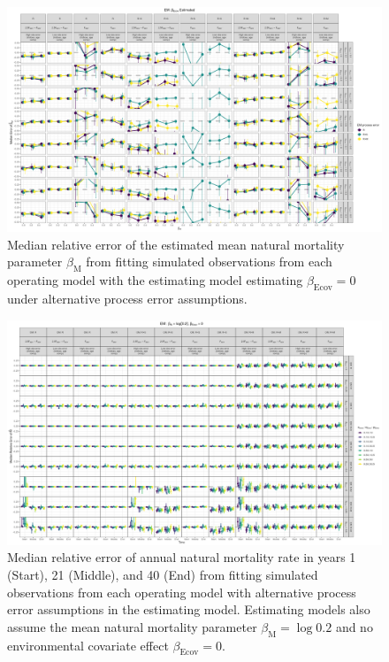 \documentclass[
  12pt,
]{article}
\begin{document}
\begin{landscape}
\begin{figure}
\caption{Median relative error of the estimated mean natural mortality parameter $\beta_\text{M}$ from fitting simulated observations from each operating model with the estimating model estimating $\beta_\text{Ecov} = 0$ under alternative process error assumptions.}\label{mean_M_bias_Ecov_beta_estimated}
\begin{center}
\includegraphics[height = \textheight]{mean_M_bias_all_PE_effect_Ecov_beta_estimated.png}
\end{center}
\end{figure}
\end{landscape}

\begin{landscape}
\begin{figure}
\caption{Median relative error of annual natural mortality rate in years 1 (Start), 21 (Middle), and 40 (End) from fitting simulated observations from each operating model with alternative process error assumptions in the estimating model. Estimating models also assume the mean natural mortality parameter $\beta_\text{M} = \log 0.2$ and no environmental covariate effect $\beta_\text{Ecov} = 0$.}\label{annual_M_bias_M_fixed_beta_fixed}
\begin{center}
\includegraphics[height = \textheight]{annual_M_bias_all_PE_effect_M_fixed_beta_fixed.png}
\end{center}
\end{figure}
\end{landscape}
\end{document}
